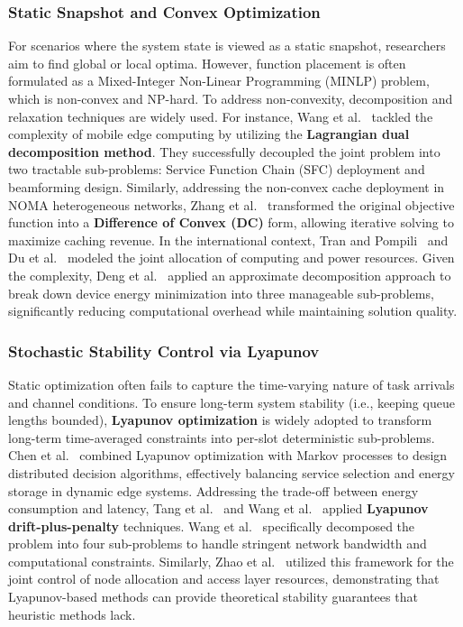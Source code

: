 \documentclass[lettersize,journal]{IEEEtran}
\begin{document}
\subsubsection{Static Snapshot and Convex Optimization}
For scenarios where the system state is viewed as a static snapshot, researchers aim to find global or local optima. However, function placement is often formulated as a Mixed-Integer Non-Linear Programming (MINLP) problem, which is non-convex and NP-hard.
To address non-convexity, decomposition and relaxation techniques are widely used. For instance, Wang et al.~\cite{wang2021Lagrangian} tackled the complexity of mobile edge computing by utilizing the \textbf{Lagrangian dual decomposition method}. They successfully decoupled the joint problem into two tractable sub-problems: Service Function Chain (SFC) deployment and beamforming design. Similarly, addressing the non-convex cache deployment in NOMA heterogeneous networks, Zhang et al.~\cite{zhang2020Difference} transformed the original objective function into a \textbf{Difference of Convex (DC)} form, allowing iterative solving to maximize caching revenue.
In the international context, Tran and Pompili~\cite{tran2018MINLP} and Du et al.~\cite{du2018Computation} modeled the joint allocation of computing and power resources. Given the complexity, Deng et al.~\cite{deng2015Towards} applied an approximate decomposition approach to break down device energy minimization into three manageable sub-problems, significantly reducing computational overhead while maintaining solution quality.



\subsubsection{Stochastic Stability Control via Lyapunov}
Static optimization often fails to capture the time-varying nature of task arrivals and channel conditions. To ensure long-term system stability (i.e., keeping queue lengths bounded), \textbf{Lyapunov optimization} is widely adopted to transform long-term time-averaged constraints into per-slot deterministic sub-problems.
Chen et al.~\cite{chen2022Lyapunov} combined Lyapunov optimization with Markov processes to design distributed decision algorithms, effectively balancing service selection and energy storage in dynamic edge systems. Addressing the trade-off between energy consumption and latency, Tang et al.~\cite{tang2023Wireless} and Wang et al.~\cite{wang2022Edge} applied \textbf{Lyapunov drift-plus-penalty} techniques. Wang et al.~\cite{wang2022Edge} specifically decomposed the problem into four sub-problems to handle stringent network bandwidth and computational constraints.
Similarly, Zhao et al.~\cite{zhao2018FEMOS} utilized this framework for the joint control of node allocation and access layer resources, demonstrating that Lyapunov-based methods can provide theoretical stability guarantees that heuristic methods lack.
\end{document}
